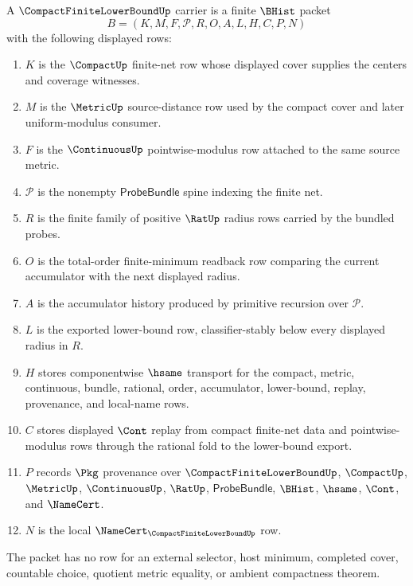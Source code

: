 \begin{definition}
\label{def:compact-finite-lower-bound-carrier}
A $\CompactFiniteLowerBoundUp$ carrier is a finite $\BHist$ packet
$$
B=(K,M,F,\mathcal{P},R,O,A,L,H,C,P,N)
$$
with the following displayed rows:
\begin{enumerate}
\item $K$ is the $\CompactUp$ finite-net row whose displayed cover supplies the centers and coverage witnesses.
\item $M$ is the $\MetricUp$ source-distance row used by the compact cover and later uniform-modulus consumer.
\item $F$ is the $\ContinuousUp$ pointwise-modulus row attached to the same source metric.
\item $\mathcal{P}$ is the nonempty $\mathsf{ProbeBundle}$ spine indexing the finite net.
\item $R$ is the finite family of positive $\RatUp$ radius rows carried by the bundled probes.
\item $O$ is the total-order finite-minimum readback row comparing the current accumulator with the next displayed radius.
\item $A$ is the accumulator history produced by primitive recursion over $\mathcal{P}$.
\item $L$ is the exported lower-bound row, classifier-stably below every displayed radius in $R$.
\item $H$ stores componentwise $\hsame$ transport for the compact, metric, continuous, bundle, rational, order, accumulator, lower-bound, replay, provenance, and local-name rows.
\item $C$ stores displayed $\Cont$ replay from compact finite-net data and pointwise-modulus rows through the rational fold to the lower-bound export.
\item $P$ records $\Pkg$ provenance over $\CompactFiniteLowerBoundUp$, $\CompactUp$, $\MetricUp$, $\ContinuousUp$, $\RatUp$, $\mathsf{ProbeBundle}$, $\BHist$, $\hsame$, $\Cont$, and $\NameCert$.
\item $N$ is the local $\NameCert_{\CompactFiniteLowerBoundUp}$ row.
\end{enumerate}
The packet has no row for an external selector, host minimum, completed cover, countable choice, quotient metric equality, or ambient compactness theorem.
\end{definition}

